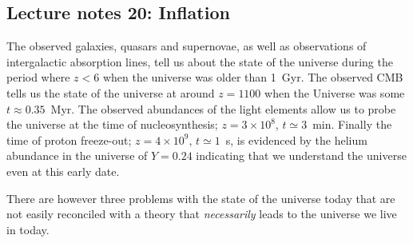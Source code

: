 \documentclass{article}
\begin{document}
\def\half{{{1}\over{2}}}
\def\third{{{1}\over{3}}}
\def\mv2{{mv^2}}
\def\vece{{\mathbf e}}
\def\vecv{{\mathbf v}}
\def\vecr{{\mathbf r}}
\def\vecp{{\mathbf p}}
\def\vecF{{\mathbf F}}
\def\vecL{{\mathbf L}}
\def\bra{\left[}
\def\ket{\right]}
\def\densu{kg/m$^3$}
\def\ergu{J/m$^3$}
\def\pressu{kg/m$^3$}
\def\velu{km/s}
\def\hubu{km/s/Mpc}
\def\msol{M$_{S}$}
\def\lsol{L$_{S}$}
\def\rsol{R$_{S}$}
\def\mearth{M$_{E}$}
\def\rearth{R$_{E}$}
\subsection*{Lecture notes 20: Inflation}
The observed galaxies, quasars and supernovae, as well as observations of intergalactic absorption lines, tell us about the state of
the universe during the period where $z<6$ when the universe was older than 1~Gyr. The observed CMB tells us the state of the universe
at around $z=1100$ when the Universe was some $t\approx 0.35$~Myr. The observed abundances of the light elements allow us to probe the 
universe at the time of nucleosynthesis; $z=3\times 10^8$, $t\simeq 3$~min. Finally the time of proton freeze-out; $z=4\times 10^9$, 
$t\simeq 1$~s, is evidenced by the helium abundance in the universe of $Y=0.24$ indicating that we understand the universe even at this
early date. 
\par
There are however three problems with the state of the universe today that are not easily reconciled with a theory that {\it necessarily}
leads to the universe we live in today. 
\end{document}
